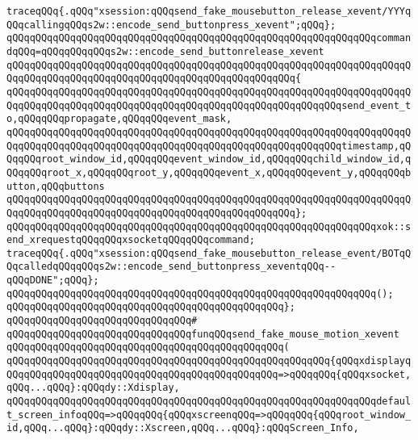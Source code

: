 \verb|traceqQQq{.qQQq"xsession:qQQqsend_fake_mousebutton_release_xevent/YYYqQQqcallingqQQqs2w::encode_send_buttonpress_xevent";qQQq};|\newline
\verb|qQQqqQQqqQQqqQQqqQQqqQQqqQQqqQQqqQQqqQQqqQQqqQQqqQQqqQQqqQQqqQQqcommandqQQq=qQQqqQQqqQQqs2w::encode_send_buttonrelease_xevent|\newline
\verb|qQQqqQQqqQQqqQQqqQQqqQQqqQQqqQQqqQQqqQQqqQQqqQQqqQQqqQQqqQQqqQQqqQQqqQQqqQQqqQQqqQQqqQQqqQQqqQQqqQQqqQQqqQQqqQQqqQQqqQQq{|\newline
\verb|qQQqqQQqqQQqqQQqqQQqqQQqqQQqqQQqqQQqqQQqqQQqqQQqqQQqqQQqqQQqqQQqqQQqqQQqqQQqqQQqqQQqqQQqqQQqqQQqqQQqqQQqqQQqqQQqqQQqqQQqqQQqqQQqsend_event_to,qQQqqQQqpropagate,qQQqqQQqevent_mask,|\newline
\verb|qQQqqQQqqQQqqQQqqQQqqQQqqQQqqQQqqQQqqQQqqQQqqQQqqQQqqQQqqQQqqQQqqQQqqQQqqQQqqQQqqQQqqQQqqQQqqQQqqQQqqQQqqQQqqQQqqQQqqQQqqQQqqQQqtimestamp,qQQqqQQqroot_window_id,qQQqqQQqevent_window_id,qQQqqQQqchild_window_id,qQQqqQQqroot_x,qQQqqQQqroot_y,qQQqqQQqevent_x,qQQqqQQqevent_y,qQQqqQQqbutton,qQQqbuttons|\newline
\verb|qQQqqQQqqQQqqQQqqQQqqQQqqQQqqQQqqQQqqQQqqQQqqQQqqQQqqQQqqQQqqQQqqQQqqQQqqQQqqQQqqQQqqQQqqQQqqQQqqQQqqQQqqQQqqQQqqQQqqQQq};|\newline
\newline
\verb|qQQqqQQqqQQqqQQqqQQqqQQqqQQqqQQqqQQqqQQqqQQqqQQqqQQqqQQqqQQqqQQqxok::send_xrequestqQQqqQQqxsocketqQQqqQQqcommand;|\newline
\verb|traceqQQq{.qQQq"xsession:qQQqsend_fake_mousebutton_release_event/BOTqQQqcalledqQQqqQQqs2w::encode_send_buttonpress_xeventqQQq--qQQqDONE";qQQq};|\newline
\verb|qQQqqQQqqQQqqQQqqQQqqQQqqQQqqQQqqQQqqQQqqQQqqQQqqQQqqQQqqQQqqQQq();|\newline
\verb|qQQqqQQqqQQqqQQqqQQqqQQqqQQqqQQqqQQqqQQqqQQqqQQq};|\newline
\newline
\verb|qQQqqQQqqQQqqQQqqQQqqQQqqQQqqQQq#|\newline
\verb|qQQqqQQqqQQqqQQqqQQqqQQqqQQqqQQqfunqQQqsend_fake_mouse_motion_xevent|\newline
\verb|qQQqqQQqqQQqqQQqqQQqqQQqqQQqqQQqqQQqqQQqqQQqqQQq(|\newline
\verb|qQQqqQQqqQQqqQQqqQQqqQQqqQQqqQQqqQQqqQQqqQQqqQQqqQQqqQQq{qQQqxdisplayqQQqqQQqqQQqqQQqqQQqqQQqqQQqqQQqqQQqqQQqqQQqqQQq=>qQQqqQQq{qQQqxsocket,qQQq...qQQq}:qQQqdy::Xdisplay,|\newline
\verb|qQQqqQQqqQQqqQQqqQQqqQQqqQQqqQQqqQQqqQQqqQQqqQQqqQQqqQQqqQQqqQQqdefault_screen_infoqQQq=>qQQqqQQq{qQQqxscreenqQQq=>qQQqqQQq{qQQqroot_window_id,qQQq...qQQq}:qQQqdy::Xscreen,qQQq...qQQq}:qQQqScreen_Info,|\newline
